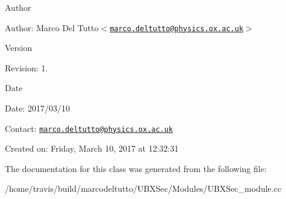 \begin{DoxyAuthor}{\-Author}

\end{DoxyAuthor}
\begin{DoxyParagraph}{\-Author\-:}
\-Marco \-Del \-Tutto$<$\href{mailto:marco.deltutto@physics.ox.ac.uk}{\tt marco.\-deltutto@physics.\-ox.\-ac.\-uk}$>$ 
\end{DoxyParagraph}


\begin{DoxyVersion}{\-Version}

\end{DoxyVersion}
\begin{DoxyParagraph}{\-Revision\-:}
1. 
\end{DoxyParagraph}


\begin{DoxyDate}{\-Date}

\end{DoxyDate}
\begin{DoxyParagraph}{\-Date\-:}
2017/03/10 
\end{DoxyParagraph}


\-Contact\-: \href{mailto:marco.deltutto@physics.ox.ac.uk}{\tt marco.\-deltutto@physics.\-ox.\-ac.\-uk}

\-Created on\-: \-Friday, \-March 10, 2017 at 12\-:32\-:31 

\-The documentation for this class was generated from the following file\-:\begin{DoxyCompactItemize}
\item 
/home/travis/build/marcodeltutto/\-U\-B\-X\-Sec/\-Modules/\-U\-B\-X\-Sec\-\_\-module.\-cc\end{DoxyCompactItemize}
